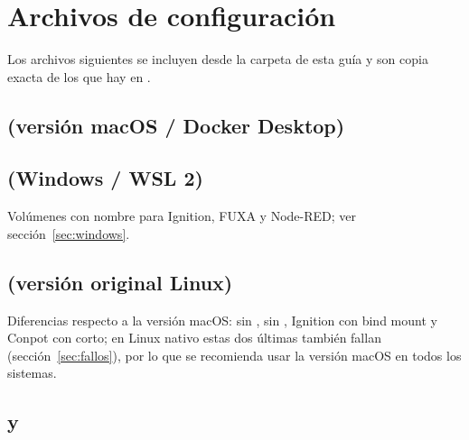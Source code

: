 \chapter{Archivos de configuración}
\label{cap:anexos}

Los archivos siguientes se incluyen desde la carpeta  de esta guía y son copia exacta de los que hay en \lab{}.

\section{ (versión macOS / Docker Desktop)}
\label{sec:anexo-compose}


\section{ (Windows / WSL 2)}
\label{sec:anexo-compose-win}
Volúmenes con nombre para Ignition, FUXA y Node-RED; ver sección~\ref{sec:windows}.


\section{ (versión original Linux)}
\label{sec:anexo-compose-linux}
Diferencias respecto a la versión macOS: sin , sin , Ignition con bind mount y Conpot con  corto; en Linux nativo estas dos últimas también fallan (sección~\ref{sec:fallos}), por lo que se recomienda usar la versión macOS en todos los sistemas.


\section{}
\label{sec:anexo-modbus}


\section{ y }
\label{sec:anexo-opcua}



\section{}
\label{sec:anexo-mosquitto}


